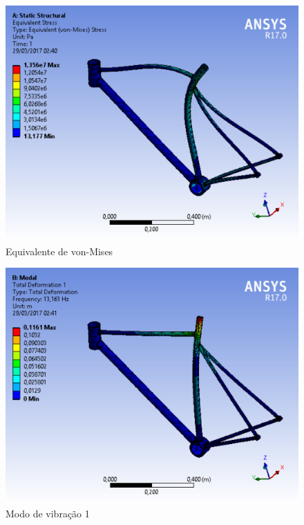 \graphicspath{{figuras/}}
	\begin{figure}[h!]
	\centering
	\includegraphics[scale=0.80]{equivalente_de_von_mises.png}
	\caption{Equivalente de von-Mises}
	\label{img:equivalente_de_von_mises}
	\end{figure}	
	
\graphicspath{{figuras/}}
	\begin{figure}[h!]
	\centering
	\includegraphics[scale=0.80]{modo_de_vibracao.png}
	\caption{Modo de vibração 1}
	\label{img:modo_de_vibracao}
	\end{figure}	
	
